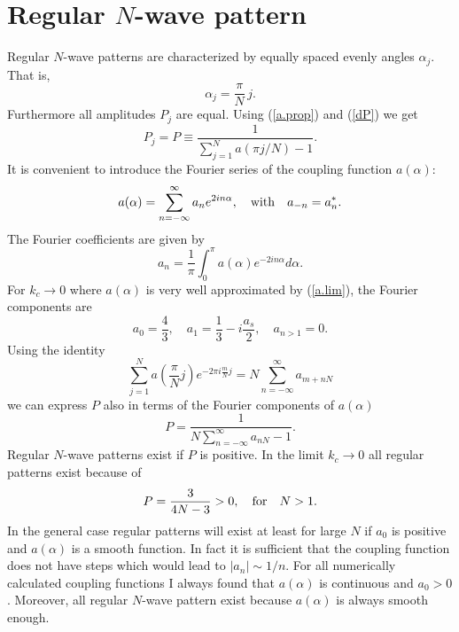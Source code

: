 \section{\protect\label{APD}Regular $N$-wave pattern}

Regular $N$-wave patterns are characterized by equally spaced 
evenly angles $\alpha_j$. That is,
\begin{equation}
  \alpha_j=\frac{\pi}{N}\,j.
  \label{APD.aj}
\end{equation}
Furthermore all amplitudes $P_j$ are equal. Using (\ref{a.prop}) and 
(\ref{dP}) we get
\begin{equation}
  P_j=P\equiv\frac{1}{\sum_{j=1}^Na(\pi j/N)-1}.
  \label{APD.P}
\end{equation}
It is convenient to introduce the Fourier series of the coupling
function $a(\alpha)$:
\begin{equation}
  a(\alpha)=\sum_{n=-\infty}^\infty a_ne^{2in\alpha},\quad{\rm with}
   \quad a_{-n}=a^*_n.
  \label{ADP.Four}
\end{equation}
The Fourier coefficients are given by
\begin{equation}
   a_n=\frac{1}{\pi}\int_0^\pi a(\alpha)e^{-2in\alpha}d\alpha.
  \label{ADP.an}
\end{equation}
For $k_c\to 0$ where $a(\alpha)$ is very well
approximated by (\ref{a.lim}), the Fourier components are
\begin{equation}
  a_0=\frac{4}{3},\quad a_1=\frac{1}{3}-i\frac{a_s}{2},
   \quad a_{n>1}=0.
  \label{APD.a.lim}
\end{equation}
Using the identity
\begin{equation}
  \sum_{j=1}^Na\left(\frac{\pi}{N}j\right) e^{-2\pi i\frac{m}{N}j}=
   N\sum_{n=-\infty}^\infty a_{m+nN}
  \label{ADP.ident}
\end{equation}
we can express $P$ also in terms of the Fourier components of 
$a(\alpha)$
\begin{equation}
  P=\frac{1}{N\sum_{n=-\infty}^\infty a_{nN}-1}.
  \label{APD.P2}
\end{equation}
Regular $N$-wave patterns exist if $P$ is positive. In the limit
$k_c\to 0$ all regular patterns exist because of 
\begin{equation}
  P=\frac{3}{4N-3}>0,\quad{\rm for}\quad N>1.
  \label{APD.P.lim}
\end{equation}
In the general case regular patterns will exist at least for large
$N$ if $a_0$ is positive and $a(\alpha)$ is a smooth function. In
fact it is sufficient that the coupling function does not have steps
which would lead to $|a_n|\sim 1/n$. For all numerically calculated
coupling functions I always found that $a(\alpha)$ is continuous and
$a_0>0$. Moreover, all regular $N$-wave pattern exist because
$a(\alpha)$ is always smooth enough.

